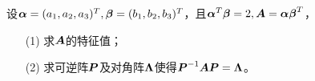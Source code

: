         \begin{frame} 
          
          \begin{li}[13-14上]
            设$\boldsymbol{\alpha}=(a_1,a_2,a_3)^T,\boldsymbol{\beta}=(b_1,b_2,b_3)^T$，且$\boldsymbol{\alpha}^T\boldsymbol{\beta}=2,\boldsymbol{A}=\boldsymbol{\alpha}\boldsymbol{\beta}^T$，
            \begin{itemize}
            \item[(1)] 求$\boldsymbol{A}$的特征值；
            \item[(2)] 求可逆阵$\boldsymbol{P}$及对角阵$\mathbf{\Lambda}$使得$\boldsymbol{P}^{-1}\boldsymbol{A}\boldsymbol{P}=\mathbf{\Lambda}$。

            \end{itemize}
          \end{li}

          
        \end{frame}
